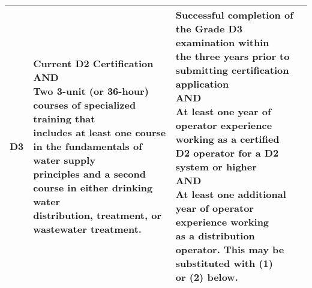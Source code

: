 \begin{table}[H]
\begin{tabular}{|c|p{7.1cm}|p{7cm}|}
D3    & \makecell[l]{Current D2 Certification\\AND\\Two 3-unit (or 36-hour) courses of specialized training that\\includes at least one course in the fundamentals of water supply\\ principles and a second course in either drinking water\\distribution, treatment, or   wastewater treatment.} & \makecell[l]{Successful completion of the Grade D3 examination within\\the three years prior to submitting certification application\\AND\\At least one year of operator experience working as a certified\\D2 operator for a D2 system or higher\\AND\\At least one additional year of operator experience working\\as a distribution operator. This may be substituted with (1)\\or (2) below.}\\ 
\hline



\end{tabular}
\end{table}

